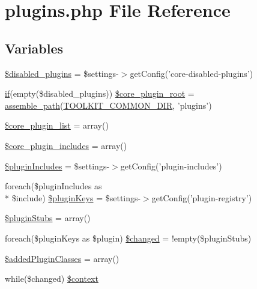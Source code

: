 \hypertarget{plugins_8php}{\section{plugins.\-php File Reference}
\label{plugins_8php}
}
\subsection*{Variables}
\begin{DoxyCompactItemize}
\item 
\hyperlink{plugins_8php_ab6573c439a183cf07dd2a2a6b8ca873d}{\$disabled\-\_\-plugins} = \$settings-\/$>$get\-Config('core-\/disabled-\/plugins')
\item 
\hyperlink{common_8php_ab5cc02e0dea17e26d5401b25d28c71a5}{if}(empty(\$disabled\-\_\-plugins)) \hyperlink{plugins_8php_a852e19bbf55d6c51c0109c5822c885e8}{\$core\-\_\-plugin\-\_\-root} = \hyperlink{system_8php_afac6dffabc4c3d916afd6b1b4156d7d6}{assemble\-\_\-path}(\hyperlink{common_8php_aa4d5af32469e1957022a401beed654e2}{T\-O\-O\-L\-K\-I\-T\-\_\-\-C\-O\-M\-M\-O\-N\-\_\-\-D\-I\-R}, 'plugins')
\item 
\hyperlink{plugins_8php_a27b356eb1d411e7f7ed1785d15968a45}{\$core\-\_\-plugin\-\_\-list} = array()
\item 
\hyperlink{plugins_8php_aaf1557085743461047339e32fe24037f}{\$core\-\_\-plugin\-\_\-includes} = array()
\item 
\hyperlink{plugins_8php_a122ee7f8aad4a1f7a48008ff12eed8f1}{\$plugin\-Includes} = \$settings-\/$>$get\-Config('plugin-\/includes')
\item 
foreach(\$plugin\-Includes as \\*
\$include) \hyperlink{plugins_8php_a7d093d3181ef48feca688de5ba5578a0}{\$plugin\-Keys} = \$settings-\/$>$get\-Config('plugin-\/registry')
\item 
\hyperlink{plugins_8php_a868418a16e416f86d25b355ef70abf8e}{\$plugin\-Stubs} = array()
\item 
foreach(\$plugin\-Keys as \$plugin) \hyperlink{plugins_8php_a843689f8628a0cc2a361697895b56ff2}{\$changed} = !empty(\$plugin\-Stubs)
\item 
\hyperlink{plugins_8php_ac7efc2293a590953b6c6640eaf342787}{\$added\-Plugin\-Classes} = array()
\item 
while(\$changed) \hyperlink{plugins_8php_a4440f2a80a414d71dc20fa13b53ca1b8}{\$context}
\end{DoxyCompactItemize}



